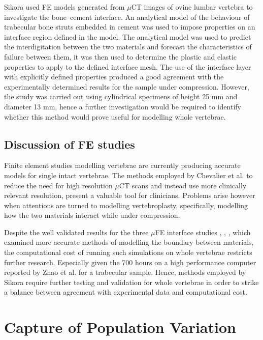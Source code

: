 Sikora \cite{Sikora2013} used FE models generated from $\mu$CT images of ovine
lumbar
vertebra to investigate the bone--cement interface. An analytical model
of the behaviour of trabecular bone struts embedded in cement was used
to impose properties on an interface region defined in the model. The
analytical model was used to predict the interdigitation between the two
materials and forecast the characteristics of failure between them, it
was then used to determine the plastic and elastic properties to apply
to the defined interface mesh. The use of the interface layer with
explicitly defined properties produced a good agreement with the
experimentally determined results for the sample under compression.
However, the study was carried out using cylindrical specimens of height
25 mm and diameter 13 mm, hence a further investigation would be
required to identify whether this method would prove useful for
modelling whole vertebrae.

\subsection{Discussion of FE studies}\label{discussion-of-fe-studies}

Finite element studies modelling vertebrae are currently producing
accurate models for single intact vertebrae. The methods employed by
Chevalier et al. \cite{Chevalier2009} to reduce the need for high resolution
$\mu$CT
scans and instead use more clinically relevant resolution, present a
valuable tool for clinicians. Problems arise however when attentions are
turned to modelling vertebroplasty, specifically, modelling how the two
materials interact while under compression.

Despite the well validated results for the three $\mu$FE interface studies \cite{Zhao2012}, \cite{Tozzi2012}, \cite{Kinzl2012a}, which examined more accurate methods of modelling the boundary between materials, the
computational
cost of
running such simulations on whole vertebrae restricts further research.
Especially given the 700 hours on a high performance computer reported by
Zhao et al. \cite{Zhao2012} for a trabecular sample. Hence, methods employed by
Sikora \cite{Sikora2013} require further testing and validation for whole
vertebrae in order to strike a balance between agreement with
experimental data and computational cost.

\section{Capture of Population Variation}\label{principal-component-analysis-pca}

